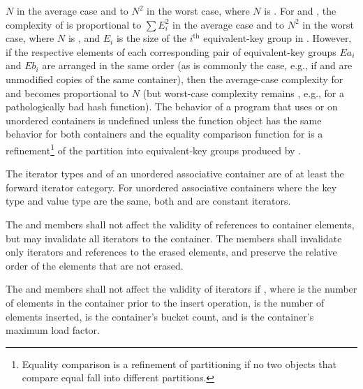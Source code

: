 $N$ in the average case and to $N^2$ in the worst case, where $N$ is
. For  and ,
the complexity of  is proportional to $\sum E_i^2$
in the average case and to $N^2$ in the worst case, where $N$ is ,
and $E_i$ is the size of the $i^\text{th}$ equivalent-key group in .
However, if the respective elements of each corresponding pair of
equivalent-key groups $Ea_i$ and $Eb_i$ are arranged in the same order
(as is commonly the case, e.g., if  and  are unmodified copies
of the same container), then the average-case complexity for
 and  becomes
proportional to $N$ (but worst-case complexity remains , e.g., for
a pathologically bad hash function). The behavior of a program that uses
 or  on unordered containers is undefined
unless the  function object has
the same behavior for both containers and the equality comparison function
for  is a refinement\footnote{Equality comparison is a refinement
of partitioning if no two objects that
compare equal fall into different partitions.}
of the partition into equivalent-key groups produced by .

\pnum
{}%
The iterator types  and  of
an unordered associative container are of at least the forward iterator
category.  For unordered associative containers where the key type and
value type are the same, both  and
 are constant iterators.

\pnum
{}%
The  and  members shall not affect the validity of references to
container elements, but may invalidate all iterators to the
container.  The  members shall invalidate only iterators and
references to the erased elements, and preserve the relative order of the
elements that are not erased.

\pnum
{}%
%
The  and  members shall not affect the validity of iterators if
, where  is the number of elements in
the container prior to the insert operation,  is the
number of elements inserted,  is the container's bucket count, and
 is the container's maximum load factor.

